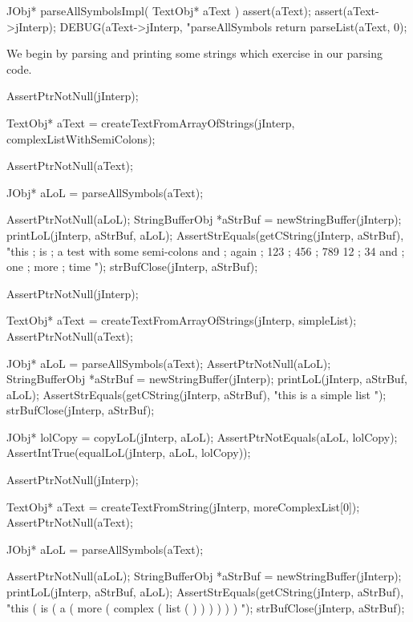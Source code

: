 \startCCode
JObj* parseAllSymbolsImpl(
  TextObj* aText
) {
  assert(aText);
  assert(aText->jInterp);
  DEBUG(aText->jInterp, "parseAllSymbols %
  return parseList(aText, 0);
}
\stopCCode

We begin by parsing and printing some strings which exercise  in our parsing code. 

\startCTest
  AssertPtrNotNull(jInterp);

  TextObj* aText =
    createTextFromArrayOfStrings(jInterp, complexListWithSemiColons);

  AssertPtrNotNull(aText);

  JObj* aLoL = parseAllSymbols(aText);

  AssertPtrNotNull(aLoL);
  StringBufferObj *aStrBuf = newStringBuffer(jInterp);
  printLoL(jInterp, aStrBuf, aLoL);
  AssertStrEquals(getCString(jInterp, aStrBuf),
    "this ; is ; a test with some semi-colons and ; again ; 123 ; 456 ; 789 12 ; 34 and ; one ; more ; time ");
  strBufClose(jInterp, aStrBuf);
\stopCTest
\stopTestCase

\startCTest
  AssertPtrNotNull(jInterp);

  TextObj* aText =
    createTextFromArrayOfStrings(jInterp, simpleList);
  AssertPtrNotNull(aText);

  JObj* aLoL = parseAllSymbols(aText);
  AssertPtrNotNull(aLoL);
  StringBufferObj *aStrBuf = newStringBuffer(jInterp);
  printLoL(jInterp, aStrBuf, aLoL);
  AssertStrEquals(getCString(jInterp, aStrBuf), "this is a simple list ");
  strBufClose(jInterp, aStrBuf);

  JObj* lolCopy = copyLoL(jInterp, aLoL);
  AssertPtrNotEquals(aLoL, lolCopy);
  AssertIntTrue(equalLoL(jInterp, aLoL, lolCopy));
\stopCTest
\stopTestCase

\startCTest
  AssertPtrNotNull(jInterp);

  TextObj* aText =
    createTextFromString(jInterp, moreComplexList[0]);
  AssertPtrNotNull(aText);

  JObj* aLoL = parseAllSymbols(aText);

  AssertPtrNotNull(aLoL);
  StringBufferObj *aStrBuf = newStringBuffer(jInterp);
  printLoL(jInterp, aStrBuf, aLoL);
  AssertStrEquals(getCString(jInterp, aStrBuf),
    "this ( is ( a ( more ( complex ( list ( ) ) ) ) ) ) ");
  strBufClose(jInterp, aStrBuf);
\stopCTest
\stopTestCase

